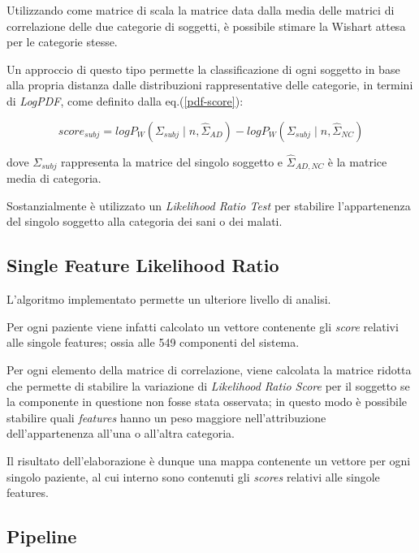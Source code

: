 \documentclass[12pt,openright,a4paper]{article}
\begin{document}
Utilizzando come matrice di scala la matrice data dalla media delle matrici di correlazione delle due categorie di soggetti, è possibile stimare la Wishart attesa per le categorie stesse.

Un approccio di questo tipo permette la classificazione di ogni soggetto in base alla propria distanza dalle distribuzioni rappresentative delle categorie, in termini di \textit{LogPDF}, come definito dalla eq.(\ref{pdf-score}):

\begin{equation}
score_{subj }= logP_{W}(\Sigma_{subj}\mid n, \hat{\Sigma}_{AD})-logP_{W}(\Sigma_{subj}\mid n,\hat{\Sigma}_{NC})
\label{pdf-score}
\end{equation}

dove $\Sigma_{subj}$ rappresenta la matrice del singolo soggetto e $\hat{\Sigma}_{AD,NC}$ è la matrice media di categoria.

Sostanzialmente è utilizzato un \textit{Likelihood Ratio Test} per stabilire l'appartenenza del singolo soggetto alla categoria dei sani o dei malati.

\subsection{Single Feature Likelihood Ratio}

L'algoritmo implementato permette un ulteriore livello di analisi.

Per ogni paziente viene infatti calcolato un vettore contenente gli \textit{score} relativi alle singole features; ossia alle 549 componenti del sistema.

Per ogni elemento della matrice di correlazione, viene calcolata la matrice ridotta che permette di stabilire la variazione di \textit{Likelihood Ratio Score} per il soggetto se la componente in questione non fosse stata osservata; in questo modo è possibile stabilire quali \textit{features} hanno un peso maggiore nell'attribuzione dell'appartenenza all'una o all'altra categoria.

Il risultato dell'elaborazione è dunque una mappa contenente un vettore per ogni singolo paziente, al cui interno sono contenuti gli \textit{scores} relativi alle singole features.

\subsection{Pipeline}
\end{document}
